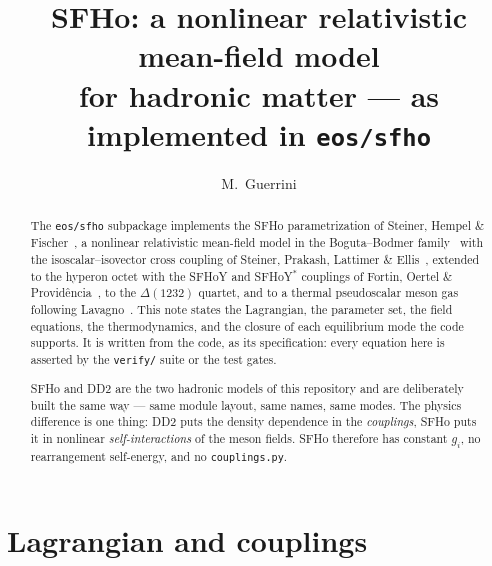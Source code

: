 \documentclass[aps,prc,onecolumn,superscriptaddress,nofootinbib,10pt]{revtex4-2}
\begin{document}
\title{SFHo: a nonlinear relativistic mean-field model \\
       for hadronic matter --- as implemented in \texttt{eos/sfho}}

\author{M.~Guerrini}

\begin{abstract}
The \texttt{eos/sfho} subpackage implements the SFHo parametrization of
Steiner, Hempel \& Fischer~\cite{Steiner2013}, a nonlinear relativistic
mean-field model in the Boguta--Bodmer family~\cite{BogutaBodmer1977} with the
isoscalar--isovector cross coupling of Steiner, Prakash, Lattimer \&
Ellis~\cite{Steiner2005}, extended to the hyperon octet with the SFHoY and
SFHoY$^{*}$ couplings of Fortin, Oertel \& Provid\^encia~\cite{Fortin2017}, to
the $\Delta(1232)$ quartet, and to a thermal pseudoscalar meson gas following
Lavagno~\cite{Lavagno2010}. This note states the Lagrangian, the parameter
set, the field equations, the thermodynamics, and the closure of each
equilibrium mode the code supports. It is written from the code, as its
specification: every equation here is asserted by the \texttt{verify/} suite
or the test gates.

SFHo and DD2 are the two hadronic models of this repository and are
deliberately built the same way --- same module layout, same names, same
modes. The physics difference is one thing: DD2 puts the density dependence in
the \emph{couplings}, SFHo puts it in nonlinear \emph{self-interactions} of
the meson fields. SFHo therefore has constant $g_i$, no rearrangement
self-energy, and no \texttt{couplings.py}.
\end{abstract}

\maketitle

\section{Lagrangian and couplings}
\label{sec:lagrangian}
\end{document}
